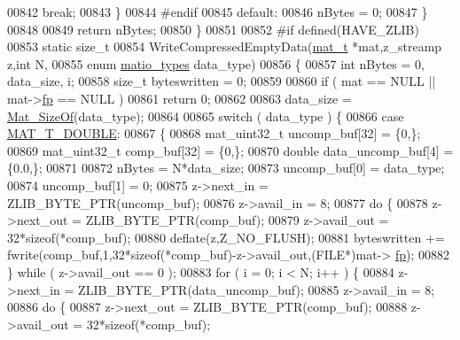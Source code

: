 \begin{DoxyCode}
{{{{00842             \textcolor{keywordflow}{break};
00843         \}
00844 \textcolor{preprocessor}{#endif}
00845         \textcolor{keywordflow}{default}:
00846             nBytes = 0;
00847     \}
00848 
00849     \textcolor{keywordflow}{return} nBytes;
00850 \}
00851 
00852 \textcolor{preprocessor}{#if defined(HAVE\_ZLIB)}
00853 \textcolor{keyword}{static} \textcolor{keywordtype}{size\_t}
00854 WriteCompressedEmptyData(\hyperlink{struct__mat__t}{mat\_t} *mat,z\_streamp z,\textcolor{keywordtype}{int} N,
00855     \textcolor{keyword}{enum} \hyperlink{group___m_a_t_gacf7b3b879282b7ab3a51190e49bf3453}{matio\_types} data\_type)
00856 \{
00857     \textcolor{keywordtype}{int} nBytes = 0, data\_size, i;
00858     \textcolor{keywordtype}{size\_t} byteswritten = 0;
00859 
00860     \textcolor{keywordflow}{if} ( mat == NULL || mat->\hyperlink{struct__mat__t_a85f562e407ca9ad4d2a6e14f839432b7}{fp} == NULL )
00861         \textcolor{keywordflow}{return} 0;
00862 
00863     data\_size = \hyperlink{group__mat__util_gab6774aabdc124c540c1e7686d0804940}{Mat\_SizeOf}(data\_type);
00864 
00865     \textcolor{keywordflow}{switch} ( data\_type ) \{
00866         \textcolor{keywordflow}{case} \hyperlink{group___m_a_t_ggacf7b3b879282b7ab3a51190e49bf3453a31e721ecf7e188196f83c32838288797}{MAT\_T\_DOUBLE}:
00867         \{
00868             mat\_uint32\_t uncomp\_buf[32] = \{0,\};
00869             mat\_uint32\_t comp\_buf[32] = \{0,\};
00870             \textcolor{keywordtype}{double} data\_uncomp\_buf[4] = \{0.0,\};
00871 
00872             nBytes = N*data\_size;
00873             uncomp\_buf[0] = data\_type;
00874             uncomp\_buf[1] = 0;
00875             z->next\_in  = ZLIB\_BYTE\_PTR(uncomp\_buf);
00876             z->avail\_in = 8;
00877             \textcolor{keywordflow}{do} \{
00878                 z->next\_out  = ZLIB\_BYTE\_PTR(comp\_buf);
00879                 z->avail\_out = 32*\textcolor{keyword}{sizeof}(*comp\_buf);
00880                 deflate(z,Z\_NO\_FLUSH);
00881                 byteswritten += fwrite(comp\_buf,1,32*\textcolor{keyword}{sizeof}(*comp\_buf)-z->avail\_out,(FILE*)mat->
      \hyperlink{struct__mat__t_a85f562e407ca9ad4d2a6e14f839432b7}{fp});
00882             \} \textcolor{keywordflow}{while} ( z->avail\_out == 0 );
00883             \textcolor{keywordflow}{for} ( i = 0; i < N; i++ ) \{
00884                 z->next\_in  = ZLIB\_BYTE\_PTR(data\_uncomp\_buf);
00885                 z->avail\_in = 8;
00886                 \textcolor{keywordflow}{do} \{
00887                     z->next\_out  = ZLIB\_BYTE\_PTR(comp\_buf);
00888                     z->avail\_out = 32*\textcolor{keyword}{sizeof}(*comp\_buf);
}}}}
\end{DoxyCode}
